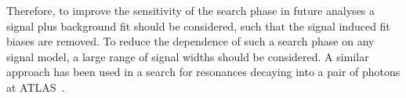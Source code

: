 Therefore, to improve the sensitivity of the search phase in future analyses
a signal plus background fit should be considered, such that the signal induced fit biases are removed.
To reduce the dependence of such a search phase on any signal model, a large range of signal widths should be considered. 
A similar approach has been used in a search for resonances decaying into a pair of photons at ATLAS~\cite{fut-diphoton}.



